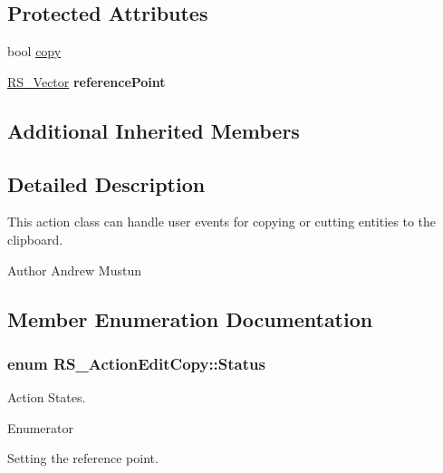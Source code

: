\subsection*{Protected Attributes}
\begin{DoxyCompactItemize}
\item 
bool \hyperlink{classRS__ActionEditCopy_a7f5523b31820f2ed72a3570a5cedad98}{copy}
\item 
\hypertarget{classRS__ActionEditCopy_a22e33fb4a2431b57aceb9ef348c4b843}{\hyperlink{classRS__Vector}{R\-S\-\_\-\-Vector} {\bfseries reference\-Point}}\label{classRS__ActionEditCopy_a22e33fb4a2431b57aceb9ef348c4b843}

\end{DoxyCompactItemize}
\subsection*{Additional Inherited Members}


\subsection{Detailed Description}
This action class can handle user events for copying or cutting entities to the clipboard.

\begin{DoxyAuthor}{Author}
Andrew Mustun 
\end{DoxyAuthor}


\subsection{Member Enumeration Documentation}
\hypertarget{classRS__ActionEditCopy_a620b5387f51d29b1b9b6d2481c6d1ff9}{
\subsubsection[{Status}]{\setlength{\rightskip}{0pt plus 5cm}enum {\bf R\-S\-\_\-\-Action\-Edit\-Copy\-::\-Status}}}\label{classRS__ActionEditCopy_a620b5387f51d29b1b9b6d2481c6d1ff9}
Action States. \begin{Desc}
\item[Enumerator]\par
\begin{description}
\item[{\em 
\hypertarget{classRS__ActionEditCopy_a620b5387f51d29b1b9b6d2481c6d1ff9a350b075c66965d65ec9f877c22488ad8}{Set\-Reference\-Point}\label{classRS__ActionEditCopy_a620b5387f51d29b1b9b6d2481c6d1ff9a350b075c66965d65ec9f877c22488ad8}
}]Setting the reference point. \end{description}
\end{Desc}


